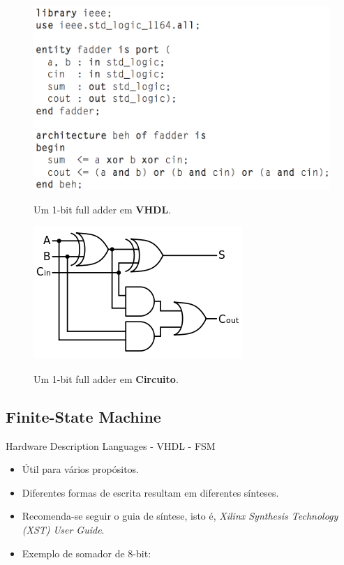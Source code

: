 \documentclass[aspectratio=169]{beamer}
\begin{document}
	\begin{frame}%
		\begin{multicols}{2}
			\begin{figure}[h]
				\centering
				\caption{Um 1-bit full adder em \textbf{VHDL}.}
				\includegraphics[height=0.85\textheight]{img/print/vhdl.png}
				\label{fig:vhdl2}
			\end{figure}
			\columnbreak
			\begin{figure}[h]
				\centering
				\caption{Um 1-bit full adder em \textbf{Circuito}.}
				\includegraphics[height=0.6\textheight]{img/print/adder.png}
				\label{fig:ci2}
			\end{figure}
		\end{multicols}
	\end{frame}
	
	\subsection{Finite-State Machine}
	\begin{frame}{Hardware Description Languages - VHDL - FSM}
		\begin{itemize}
			\item Útil para vários propósitos.
			\item Diferentes formas de escrita resultam em diferentes sínteses.
			\item Recomenda-se seguir o guia de síntese, isto é, \textit{Xilinx Synthesis Technology (XST) User Guide}.
			\item Exemplo de somador de 8-bit:
		\end{itemize}
	\end{frame}
		
\end{document}
